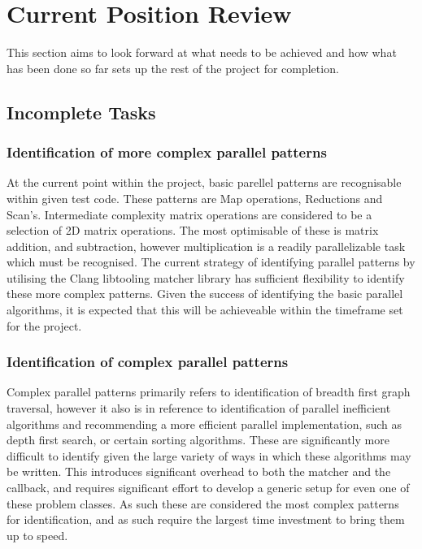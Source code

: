 
\section{Current Position Review}

This section aims to look forward at what needs to be achieved and how what has been done so far sets up the rest of the project for completion.

\subsection{Incomplete Tasks}
\subsubsection{Identification of more complex parallel patterns} 
At the current point within the project, basic parellel patterns are recognisable within given test code. These patterns are Map operations, Reductions and Scan's. Intermediate complexity matrix operations are considered to be a selection of 2D matrix operations. The most optimisable of these is matrix addition, and subtraction, however multiplication is a readily parallelizable task which must be recognised. The current strategy of identifying parallel patterns by utilising the Clang libtooling matcher library has sufficient flexibility to identify these more complex patterns. Given the success of identifying the basic parallel algorithms, it is expected that this will be achieveable within the timeframe set for the project.

\subsubsection{Identification of complex parallel patterns}
Complex parallel patterns primarily refers to identification of breadth first graph traversal, however it also is in reference to identification of parallel inefficient algorithms and recommending a more efficient parallel implementation, such as depth first search, or certain sorting algorithms. These are significantly more difficult to identify given the large variety of ways in which these algorithms may be written. This introduces significant overhead to both the matcher and the callback, and requires significant effort to develop a generic setup for even one of these problem classes. As such these are considered the most complex patterns for identification, and as such require the largest time investment to bring them up to speed.

